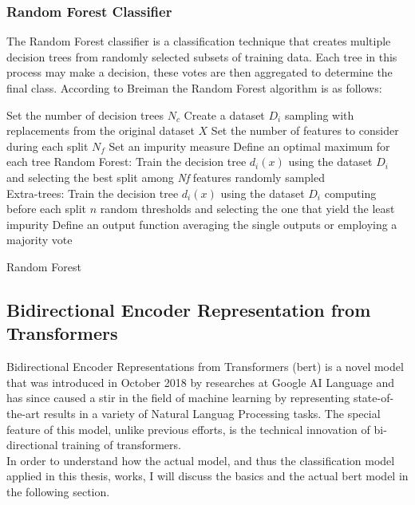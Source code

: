 \documentclass[a4paper, 11pt,titlepage,oneside,openany]{book}
\begin{document}
\subsubsection{Random Forest Classifier}
The Random Forest classifier is a classification technique that creates multiple decision trees from randomly selected subsets of training data. Each tree in this process may make a decision, these votes are then aggregated to determine the final class. According to Breiman \cite{randomforest} the Random Forest algorithm is as follows:\\

\begin{algorithm}[H]
	\DontPrintSemicolon
	Set the number of decision trees $N_c$\;
		{Create a dataset $D_i$ sampling with replacements from the original dataset $X$}
	Set the number of features  to consider during each split $N_f$\;
	Set an impurity measure\;
	Define an optimal maximum for each tree\;
		{Random Forest: Train the decision tree $d_i(x)$ using the dataset $D_i$ and selecting the best split among \textit{Nf} features randomly sampled \\
		Extra-trees:  Train the decision tree $d_i(x)$ using the dataset $D_i$ computing before each split $n$ random thresholds and selecting the one that yield the least impurity}
	Define an output function averaging the single outputs or employing a majority vote
	\caption{Random Forest}
\end{algorithm}

\newpage
\subsection{Bidirectional Encoder Representation from Transformers}
Bidirectional Encoder Representations from Transformers (\gls{bert}) \cite{bert} is a novel model that was introduced in October 2018 by researches at Google AI Language and has since caused a stir in the field of machine learning by representing state-of-the-art results in a variety of Natural Languag Processing tasks. The special feature of this model, unlike previous efforts, is the technical innovation of bi-directional training of transformers. \\
\noindent In order to understand how the actual model, and thus the classification model applied in this thesis, works, I will discuss the basics and the actual \gls{bert} model in the following section.
\end{document}
